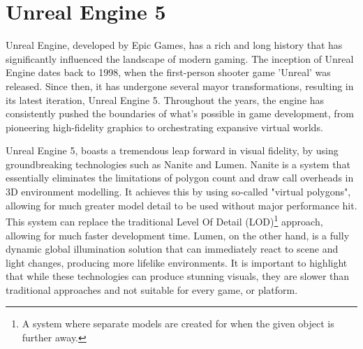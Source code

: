 \section{Unreal Engine 5}

Unreal Engine, developed by Epic Games, has a rich and long history that has significantly influenced the landscape of modern gaming. The inception of Unreal Engine dates back to 1998, when the first-person shooter game 'Unreal'\cite{unreal-game} was released. Since then, it has undergone several mayor transformations, resulting in its latest iteration, Unreal Engine 5. Throughout the years, the engine has consistently pushed the boundaries of what's possible in game development, from pioneering high-fidelity graphics to orchestrating expansive virtual worlds.

Unreal Engine 5, boasts a tremendous leap forward in visual fidelity, by using groundbreaking technologies such as Nanite and Lumen.
Nanite is a system that essentially eliminates the limitations of polygon count and draw call overheads in 3D environment modelling. It achieves this by using so-called "virtual polygons", allowing for much greater model detail to be used without major performance hit. This system can replace the traditional Level Of Detail (LOD)\footnote{A system where separate models are created for when the given object is further away.} approach, allowing for much faster development time.
Lumen, on the other hand, is a fully dynamic global illumination solution that can immediately react to scene and light changes, producing more lifelike environments. It is important to highlight that while these technologies can produce stunning visuals, they are slower than traditional approaches and not suitable for every game, or platform.
